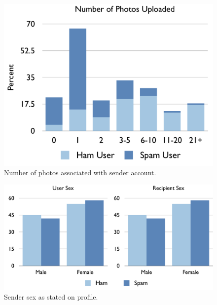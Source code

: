 \documentclass[preprint]{acm_proc_article-sp}
\begin{document}
\begin{figure}[h]
    \centering
    \includegraphics[width=\linewidth]{figures/photos.pdf}
    \caption{Number of photos associated with sender account.}
    \label{fig:photos}
\end{figure}


\begin{figure}[h]
    \centering
    \includegraphics[width=\linewidth]{figures/sex.pdf}
    \caption{Sender sex as stated on profile.}
    \label{fig:sendsex}
\end{figure}









\balancecolumns
\end{document}
